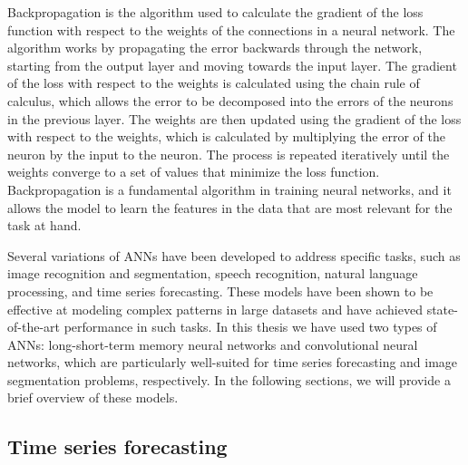 Backpropagation is the algorithm used to calculate the gradient of the loss
function with respect to the weights of the connections in a neural network.
The algorithm works by propagating the error backwards through the network,
starting from the output layer and moving towards the input layer. The
gradient of the loss with respect to the weights is calculated using the
chain
rule of calculus, which allows the error to be decomposed into the errors of
the neurons in the previous layer. The weights are then updated using the
gradient of the loss with respect to the weights, which is calculated by
multiplying the error of the neuron by the input to the neuron. The process
is
repeated iteratively until the weights converge to a set of values that
minimize the loss function. Backpropagation is a fundamental algorithm in
training neural networks, and it allows the model to learn the features in
the
data that are most relevant for the task at hand.

Several variations of ANNs have been developed to address specific tasks, such
as image recognition and segmentation, speech recognition, natural language
processing, and time series forecasting. These models have been shown to be
effective at modeling complex patterns in large datasets and have achieved
state-of-the-art performance in such tasks. In this thesis we have used two
types of ANNs: long-short-term memory neural networks and convolutional neural
networks, which are particularly well-suited for time series forecasting and
image segmentation problems, respectively. In the following sections, we will
provide a brief overview of these models.

\subsection{\label{sec:Time-series forecasting} Time series forecasting}

